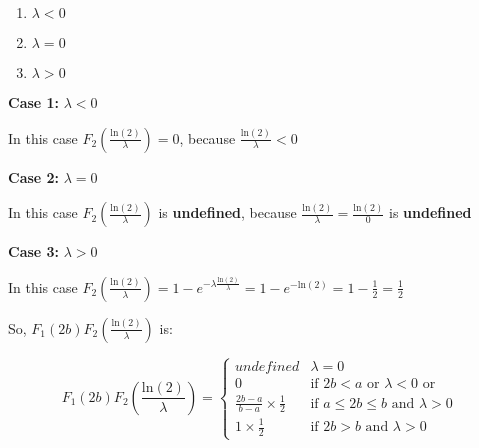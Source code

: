 \singlespacing

\begin{enumerate}
    \item $\lambda < 0$
    \item $\lambda = 0$
    \item $\lambda > 0$
\end{enumerate}

\singlespacing

\textbf{Case 1:} $\lambda < 0$

\singlespacing

In this case $F_2(\frac{\text{ln}(2)}{\lambda}) = 0$, because $\frac{\text{ln}(2)}{\lambda} < 0$

\singlespacing

\textbf{Case 2:} $\lambda = 0$

\singlespacing

In this case $F_2(\frac{\text{ln}(2)}{\lambda})$ is \textbf{undefined}, because $\frac{\text{ln}(2)}{\lambda} = \frac{\text{ln}(2)}{0}$ is \textbf{undefined}

\singlespacing

\textbf{Case 3:} $\lambda > 0$

\singlespacing

In this case $F_2(\frac{\text{ln}(2)}{\lambda}) = 1 - e^{-\lambda \frac{\text{ln}(2)}{\lambda}} = 1 - e^{-\text{ln}(2)} = 1 - \frac{1}{2} = \frac{1}{2}$

\singlespacing

So, $F_1(2b)F_2(\frac{\text{ln}(2)}{\lambda})$ is:

\singlespacing

\begin{equation}
    F_1(2b)F_2(\frac{\text{ln}(2)}{\lambda}) = \begin{cases}
        undefined                            & \lambda = 0                                           \\
        0                                    & \text{if } 2b < a \text{ or } \lambda < 0 \text{ or } \\
        \frac{2b - a}{b-a}\times \frac{1}{2} & \text{if } a \leq 2b \leq b \text{ and } \lambda > 0  \\
        1\times \frac{1}{2}                  & \text{if } 2b > b \text{ and } \lambda > 0
    \end{cases}
\end{equation}